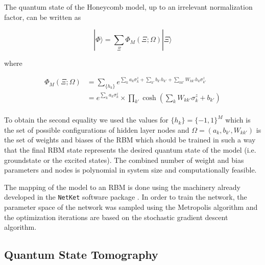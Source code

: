 \documentclass{article}
\begin{document}
The quantum state of the Honeycomb model, up to an irrelevant normalization factor, can be written as 

\begin{equation}\label{eq:19_0}
    |\Phi\rangle=\sum_{\Xi}\Phi_{M}(\Xi;\Omega)|\Xi\rangle
\end{equation}{}

where

\begin{equation}\label{eq:19_1}
    \begin{aligned}
        \Phi_{M}(\Xi;\Omega) &=  \sum_{\{h_{k}\}}e^{\sum_{k}a_{k}\sigma_{k}^{z}+\sum_{k'}b_{k'}h_{k'}+\sum_{kk'}W_{kk'}h_{k}\sigma_{k'}^{z}}\\
        &= e^{\sum_k a_k \sigma_k^z} \times \prod_{k'} \cosh \left(\sum_k W_{kk'} \sigma_k^z + b_{k'} \right)
    \end{aligned}
\end{equation}\\

To obtain the second equality we used the values for $\{h_{k}\}=\{-1,1\}^{M}$ which is the set of possible configurations of hidden layer nodes and $\Omega=(a_{k},b_{k'},W_{kk'})$ is the set of weights and biases of the RBM which should be trained in such a way that the final RBM state represents the desired quantum state of the model (i.e. groundstate or the excited states). The combined number of weight and bias parameters and nodes is polynomial in system size and computationally feasible.


The mapping of the model to an RBM is done using the machinery already developed in the \texttt{NetKet} software package \cite{netket:2019}. In order to train the network, the parameter space of the network was sampled using the Metropolis algorithm and the optimization iterations are based on the stochastic gradient descent algorithm. 

\subsection{Quantum State Tomography}
\end{document}
